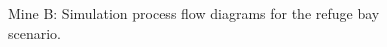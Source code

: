 \begin{appendices}
	\begin{figure}[h]
		\centering
		\caption{Mine B: Simulation process flow diagrams for the refuge bay scenario.}
		\label{fig: Refuge bay layout}
	\end{figure}	


\end{appendices}

